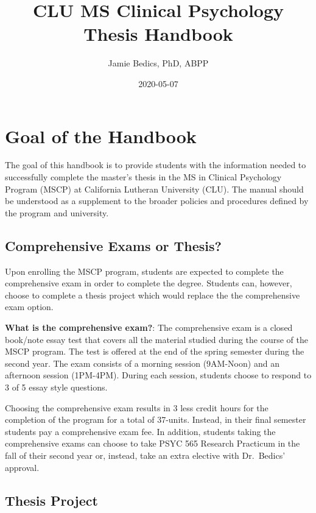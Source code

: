 \documentclass[]{book}
\title{CLU MS Clinical Psychology Thesis Handbook}
\author{Jamie Bedics, PhD, ABPP}
\date{2020-05-07}
\begin{document}
\maketitle

{
\setcounter{tocdepth}{1}
\tableofcontents
}
\hypertarget{goal-of-the-handbook}{%
\chapter{Goal of the Handbook}\label{goal-of-the-handbook}}

The goal of this handbook is to provide students with the information needed to successfully complete the master's thesis in the MS in Clinical Psychology Program (MSCP) at California Lutheran University (CLU). The manual should be understood as a supplement to the broader policies and procedures defined by the program and university.

\hypertarget{comprehensive-exams-or-thesis}{%
\section{Comprehensive Exams or Thesis?}\label{comprehensive-exams-or-thesis}}

Upon enrolling the MSCP program, students are expected to complete the comprehensive exam in order to complete the degree. Students can, however, choose to complete a thesis project which would replace the the comprehensive exam option.

\textbf{What is the comprehensive exam?}: The comprehensive exam is a closed book/note essay test that covers all the material studied during the course of the MSCP program. The test is offered at the end of the spring semester during the second year. The exam consists of a morning session (9AM-Noon) and an afternoon session (1PM-4PM). During each session, students choose to respond to 3 of 5 essay style questions.

Choosing the comprehensive exam results in 3 less credit hours for the completion of the program for a total of 37-units. Instead, in their final semester students pay a comprehensive exam fee. In addition, students taking the comprehensive exams can choose to take PSYC 565 Research Practicum in the fall of their second year or, instead, take an extra elective with Dr.~Bedics' approval.

\hypertarget{thesis-project}{%
\section{Thesis Project}\label{thesis-project}}
\end{document}
